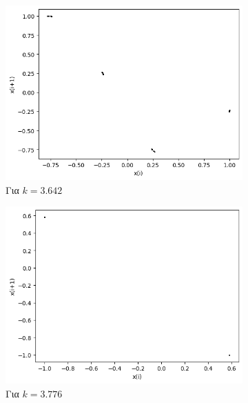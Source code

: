 \begin{figure}[ht]
	\centering
	\begin{subfigure}[b]{0.4\textwidth}
		\centering
		\includegraphics[width=\textwidth]{LateX images/cheb q=0.8/g10}
		\caption{Για $k=3.642$}
		\label{f:k137}
	\end{subfigure}
	\hfill	
	\begin{subfigure}[b]{0.4\textwidth}
		\centering
		\includegraphics[width=\textwidth]{LateX images/cheb q=0.8/g11}
		\caption{Για $k=3.776$}
		\label{f:k138}
	\end{subfigure}
	\hfill
	\begin{subfigure}[b]{0.4\textwidth}
		\centering

\end{subfigure}
\end{figure}
